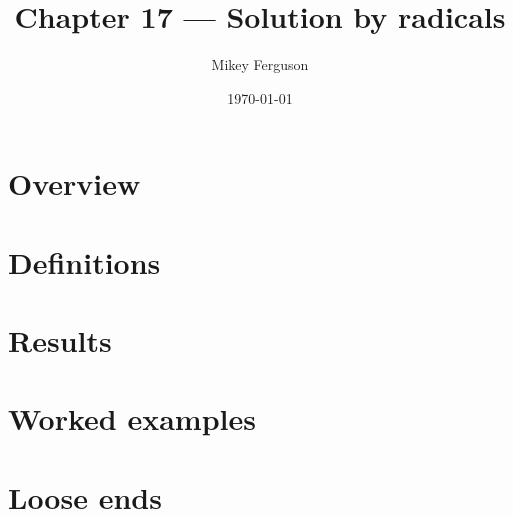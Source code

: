\documentclass[11pt]{article}
\title{Chapter 17 --- Solution by radicals}
\author{Mikey Ferguson}
\date{\today}
\begin{document}
\maketitle
\tableofcontents
\bigskip

\section{Overview}

\section{Definitions}

\section{Results}

\section{Worked examples}

\section{Loose ends}
\end{document}

